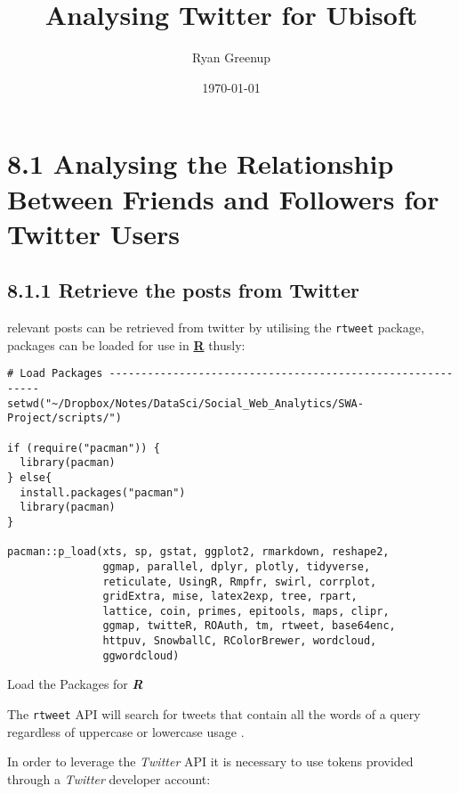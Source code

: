 \documentclass[11pt]{article}
\author{Ryan Greenup}
\date{\today}
\title{Analysing Twitter for Ubisoft}
\begin{document}
\maketitle
\tableofcontents



\section{8.1 Analysing the Relationship Between Friends and Followers for Twitter Users}
\label{sec:orga06ed0c}
\subsection{8.1.1 Retrieve the posts from Twitter}
\label{sec:orgf1e76da}
relevant posts can be retrieved from twitter by utilising the \texttt{rtweet} package, packages can be loaded for use in \textbf{\textbf{\uline{R}}} thusly:

\begin{listing}[htbp]
\begin{verbatim}
# Load Packages -----------------------------------------------------------
setwd("~/Dropbox/Notes/DataSci/Social_Web_Analytics/SWA-Project/scripts/")

if (require("pacman")) {
  library(pacman)
} else{
  install.packages("pacman")
  library(pacman)
}

pacman::p_load(xts, sp, gstat, ggplot2, rmarkdown, reshape2,
               ggmap, parallel, dplyr, plotly, tidyverse,
               reticulate, UsingR, Rmpfr, swirl, corrplot,
               gridExtra, mise, latex2exp, tree, rpart,
               lattice, coin, primes, epitools, maps, clipr,
               ggmap, twitteR, ROAuth, tm, rtweet, base64enc,
               httpuv, SnowballC, RColorBrewer, wordcloud,
               ggwordcloud)
\end{verbatim}
\caption{\label{org16d6a5a}Load the Packages for \textbf{\textbf{\emph{R}}}}
\end{listing}

The \texttt{rtweet} API will search for tweets that contain all the words of a query
regardless of uppercase or lowercase usage \cite{kearney2019}.

In order to leverage the \emph{Twitter} API it is necessary to use tokens provided through a \emph{Twitter} developer account:
\end{document}
